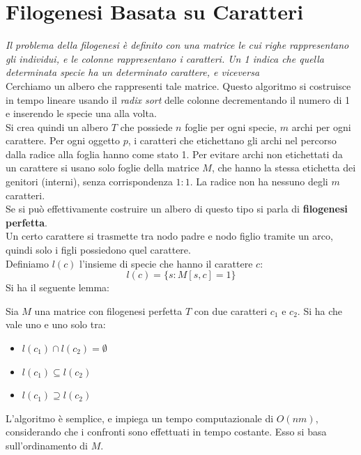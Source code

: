 \documentclass[a4paper,12pt, oneside]{book}
\begin{document}
\section{Filogenesi Basata su Caratteri}
\textit{Il problema della filogenesi è definito con una matrice le cui
  righe rappresentano gli individui, e le 
colonne rappresentano i caratteri. Un 1 indica che quella determinata
specie ha un determinato carattere, e viceversa}\\
Cerchiamo un albero che rappresenti tale matrice. Questo algoritmo si
costruisce in tempo lineare usando il \textit{radix sort} delle
colonne decrementando il numero di 1 e inserendo le specie 
una alla volta.\\
Si crea quindi un albero $T$ che possiede $n$ foglie per ogni specie,
$m$ archi per ogni carattere. Per ogni oggetto $p$, i caratteri che
etichettano gli archi nel percorso dalla radice alla foglia 
hanno come stato 1. Per evitare archi non etichettati da un carattere
si usano solo foglie della matrice
$M$, che hanno la stessa etichetta dei genitori (interni), senza
corrispondenza $1 : 1$. La radice non ha nessuno degli $m$
caratteri. \\
Se si può effettivamente costruire un albero di questo tipo si parla
di \textbf{filogenesi perfetta}.\\
Un certo carattere si trasmette tra nodo padre e nodo figlio tramite
un arco, quindi solo i figli possiedono quel carattere. \\
Definiamo $l(c)$ l’insieme di specie che hanno il carattere $c$:
\[l(c)=\{s:M[s,c]=1\}\]
Si ha il seguente lemma:
\begin{lemma}
  Sia $M$ una matrice con filogenesi perfetta $T$ con due caratteri
  $c_1$ e $c_2$. Si ha che vale uno e uno solo tra:
  \begin{itemize}
    \item $l(c_1)\cap l(c_2)=\emptyset$
    \item $l(c_1)\subseteq l(c_2)$
    \item $l(c_1)\supseteq l(c_2)$
  \end{itemize}
\end{lemma}
L’algoritmo è semplice, e impiega un tempo computazionale di $O(nm)$,
considerando che i confronti sono effettuati in tempo costante. Esso
si basa sull’ordinamento di $M$.
\end{document}
